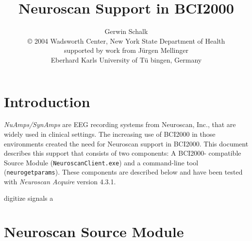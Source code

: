 \documentclass[letterpaper, oneside, 12pt]{article}
\begin{document}
%
\title{Neuroscan Support in BCI2000}
\author{Gerwin Schalk\\ \small{\copyright{} 2004 Wadsworth Center, New
York State Department of Health}\\ \small{supported by work from
J\"{u}rgen Mellinger}\\ \small{Eberhard Karls University of T\"{u}
bingen, Germany}}
\maketitle

\tableofcontents

\newpage


\section{Introduction}

\sloppypar \emph{NuAmps/SynAmps} are EEG recording systems from
Neuroscan, Inc., that are
widely used in clinical settings. The increasing use of BCI2000 in
those
environments created the need for Neuroscan support in BCI2000. This
document
describes this support that consists of two components: A BCI2000-
compatible
Source Module (\texttt{NeuroscanClient.exe}) and a command-line tool
(\texttt{neurogetparams}). These components are described below and
have been
tested with \emph{Neuroscan Acquire} version 4.3.1.

digitize signals
a

\section{Neuroscan Source Module}
\end{document}

